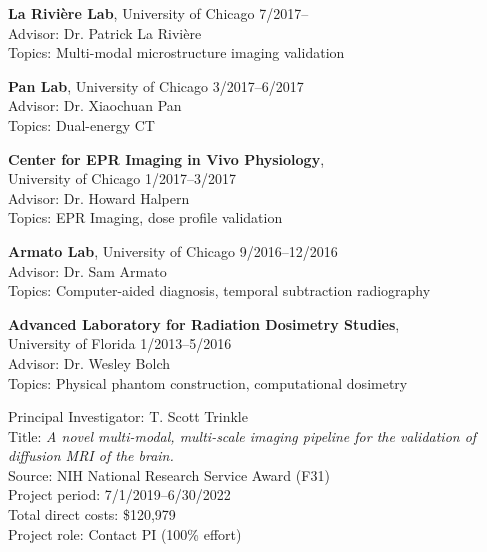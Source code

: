 \documentclass[10pt,letterpaper]{article}
\begin{document}
\begin{etaremune}[labelsep=0.035\textwidth]
\item
  {\textbf{La Rivi\`ere Lab}, University of Chicago} \hfill 7/2017--\\
  Advisor: Dr. Patrick La Rivi\`ere\\
  Topics: Multi-modal microstructure imaging validation
\item
  {\textbf{Pan Lab}, University of Chicago} \hfill 3/2017--6/2017\\
  Advisor: Dr. Xiaochuan Pan\\
  Topics: Dual-energy CT
\item
  {\textbf{Center for EPR Imaging in Vivo Physiology}, \\
    University of Chicago} \hfill 1/2017--3/2017\\
  Advisor: Dr. Howard Halpern\\
  Topics: EPR Imaging, dose profile validation
\item
  {\textbf{Armato Lab}, University of Chicago} \hfill 9/2016--12/2016\\
  Advisor: Dr. Sam Armato\\
  Topics: Computer-aided diagnosis, temporal subtraction radiography
\item
  {\textbf{Advanced Laboratory for Radiation Dosimetry Studies}, \\
    University of Florida} \hfill 1/2013--5/2016\\
  Advisor: Dr. Wesley Bolch\\
  Topics: Physical phantom construction, computational dosimetry
\end{etaremune}

\begin{etaremune}[labelsep=0.035\textwidth]
\item
  Principal Investigator: T. Scott Trinkle\\
  Title: \textit{A novel multi-modal, multi-scale imaging pipeline for the
    validation of diffusion MRI of the brain.}\\
  Source: NIH National Research Service Award (F31)\\
  Project period: 7/1/2019--6/30/2022\\
  Total direct costs: \$120,979\\
  Project role: Contact PI (100\% effort)
\end{etaremune}
\end{document}
